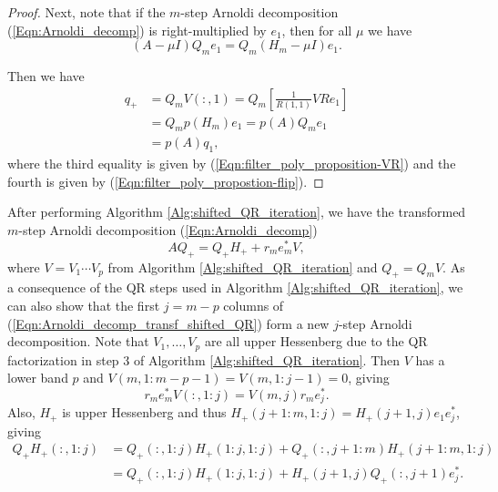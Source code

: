 \begin{enumerate}
\begin{proof}
Next, note that if the $m$-step Arnoldi decomposition (\ref{Eqn:Arnoldi_decomp}) is right-multiplied by $e_1$, then for all $\mu$ we have
\begin{equation} 			\label{Eqn:filter_poly_propostion-flip}
\left(A - \mu I \right)Q_me_1 = Q_m \left(H_m - \mu I \right) e_1.
\end{equation}

Then we have
\[
\begin{split}
q_+ 
	& = Q_mV(:,1) = Q_m \left[ \frac{1}{R(1,1)}VR e_1 \right] 	\\
	& 	= Q_m p(H_m) e_1 = p(A)Q_m e_1	\\
	& 	= p(A) q_1,
\end{split}
\]
where the third equality is given by (\ref{Eqn:filter_poly_proposition-VR}) and the fourth is given by (\ref{Eqn:filter_poly_propostion-flip}).
\end{proof}


After performing Algorithm \ref{Alg:shifted_QR_iteration}, we have the transformed $m$-step Arnoldi decomposition (\ref{Eqn:Arnoldi_decomp})
\begin{equation}			\label{Eqn:Arnoldi_decomp_transf_shifted_QR}
AQ_+ = Q_+H_+ + r_me_m^*V,
\end{equation}
where $V = V_1 \cdots V_p$ from Algorithm \ref{Alg:shifted_QR_iteration} and $Q_+ = Q_mV$.  As a consequence of the QR steps used in Algorithm \ref{Alg:shifted_QR_iteration}, we can also show that the first $j = m-p$ columns of (\ref{Eqn:Arnoldi_decomp_transf_shifted_QR}) form a new $j$-step Arnoldi decomposition.  Note that $V_1, \ldots, V_p$ are all upper Hessenberg due to the QR factorization in step 3 of Algorithm \ref{Alg:shifted_QR_iteration}.  Then $V$ has a lower band $p$ and $V(m, 1:m-p-1) = V(m, 1:j-1) = 0$, giving
\begin{equation} 			\label{Eqn:Arnoldi_decomp_transf_shifted_QR-part1}
r_me_m^*V(:, 1:j) = V(m,j)r_me_j^*.
\end{equation}
Also, $H_+$ is upper Hessenberg and thus $H_+(j+1:m, 1:j) = H_+(j+1,j)e_1e_j^*$, giving
\begin{equation} 		\label{Eqn:Arnoldi_decomp_transf_shifted_QR-part2}
\begin{split}
Q_+H_+(:, 1:j) 
	&	=  Q_+(:, 1:j) H_+(1:j, 1:j) + Q_+(:, j+1:m)H_+(j+1:m, 1:j) \\
	&	=	Q_+(:, 1:j) H_+(1:j, 1:j) +  H_+(j+1,j)Q_+(:,j+1)e_j^*.
\end{split}
\end{equation}


\end{enumerate}
